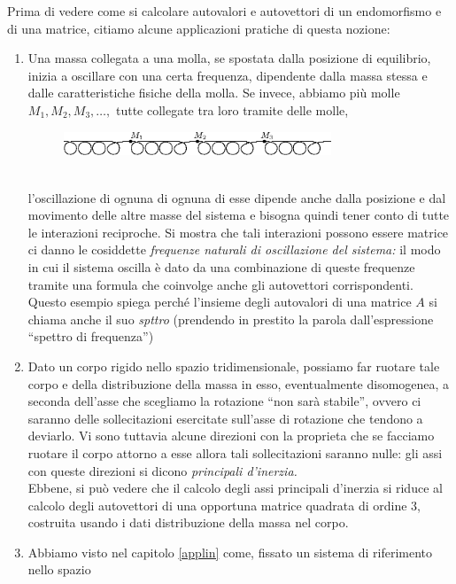 \documentclass{book}
\begin{document}
Prima di vedere come si calcolare autovalori e autovettori di un endomorfismo e di una matrice, citiamo alcune
applicazioni pratiche di questa nozione:
\begin{enumerate}
\item Una massa collegata a una molla, se spostata dalla posizione di equilibrio, inizia a oscillare con una certa
  frequenza, dipendente dalla massa stessa e dalle caratteristiche fisiche della molla. Se invece, abbiamo più
  molle $M_1,M_2,M_3,\dots,$ tutte collegate tra loro tramite delle molle,
  \begin{figure}[ht]
    \centering
    \includegraphics[width=8cm]{img/finiti/imgex5-1-2.eps}
  \end{figure}\\
  l'oscillazione di ognuna di ognuna di esse dipende anche dalla posizione e dal movimento delle altre masse del
  sistema e bisogna quindi tener conto di tutte le interazioni reciproche. Si mostra che tali interazioni possono
  essere matrice ci danno le cosiddette \emph{frequenze naturali di oscillazione del sistema:} il modo in cui il
  sistema oscilla è dato da una combinazione di queste frequenze tramite una formula che coinvolge anche gli
  autovettori corrispondenti.\\
  Questo esempio spiega perché l'insieme degli autovalori di una matrice $A$ si chiama anche il suo
  \textit{spttro} (prendendo in prestito la parola dall'espressione ``spettro di frequenza'')
\item Dato un corpo rigido nello spazio tridimensionale, possiamo far ruotare tale corpo e della distribuzione
  della massa in esso, eventualmente disomogenea, a seconda dell'asse che scegliamo la rotazione ``non sarà
  stabile'', ovvero ci saranno delle sollecitazioni esercitate sull'asse di rotazione che tendono a deviarlo.
  Vi sono tuttavia alcune direzioni con la proprieta che se facciamo ruotare il corpo attorno a esse allora tali
  sollecitazioni saranno nulle: gli assi con queste direzioni si dicono \emph{principali d'inerzia.}\\
  Ebbene, si può vedere che il calcolo degli assi principali d'inerzia si riduce al calcolo degli autovettori di
  una opportuna matrice quadrata di ordine $3$, costruita usando i dati distribuzione della massa nel corpo.
\item Abbiamo visto nel capitolo \ref{applin} come, fissato un sistema di riferimento nello spazio

\end{enumerate}
\end{document}
